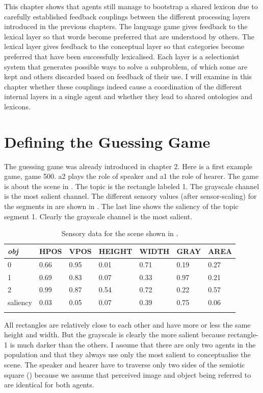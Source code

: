 This chapter shows that agents still manage to 
bootstrap a shared lexicon due to carefully established
feedback couplings between the different processing
layers introduced in the previous chapters. 
The language game gives feedback to the lexical layer so 
that words become preferred that are understood by others.
The lexical layer gives feedback to the conceptual layer
so that categories become preferred that have been
successfully lexicalised. Each layer is a selectionist system
that generates possible ways to solve a subproblem, of which some 
are kept and others discarded based on feedback of their use.
I will examine in this chapter whether these
couplings indeed cause a coordination of the different internal
layers in a single agent and whether they lead to shared 
ontologies and lexicons. 

\section{Defining the Guessing Game}

The guessing game was already introduced in chapter 2. Here is a first example game, game 500.
{\bfshape  a2} plays the role of speaker and {\bfshape  a1} the role of hearer. The game is about the scene in
. The topic is the rectangle labeled 1. The grayscale channel is the most 
salient channel. The different sensory values (after sensor-scaling)
for the segments in  are shown in 
. The last line shows the saliency of 
the topic segment 1.  Clearly the grayscale channel is the most salient. 


\begin{table}
\begin{center}
\begin{tabular}{ l  l  l  l  l  l  l }
\lsptoprule
{\itshape obj} & HPOS & VPOS & HEIGHT & WIDTH & GRAY & AREA \\ \midrule
0 & 0.66 & 0.95 & 0.01 & 0.71 & 0.19 & 0.27\\ 
1 & 0.69 & 0.83 & 0.07 & 0.33 & 0.97 & 0.21\\ 
2 & 0.99 & 0.87 & 0.54 & 0.72 & 0.22 & 0.57\\ 
saliency & 0.03 & 0.05 & 0.07 & 0.39 & 0.75 & 0.06 \\ 
\lspbottomrule
\end{tabular}
\caption{\label{tab:t-rect1} Sensory data for the scene shown in .}
\end{center}
\end{table}
All rectangles are relatively close to each other and have more or less the 
same height and width. But the grayscale is clearly the more salient because rectangle-1 is 
much darker than the others. I assume that there are only two agents in the population and that they always use only 
the most salient to conceptualise the scene. 
The speaker and hearer have to traverse only 
two sides of the semiotic square ()
because we assume that perceived image and object being
referred to are identical for both agents. 


